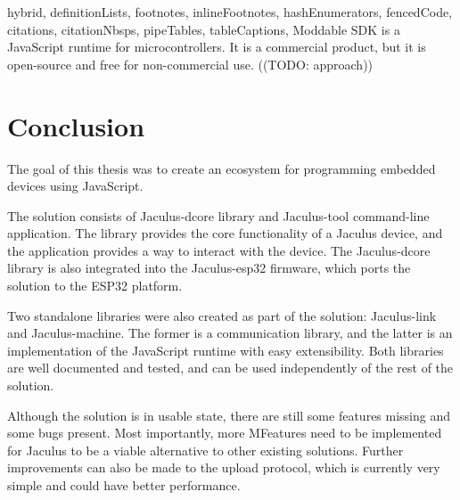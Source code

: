 \begin{markdown*}{%
  hybrid,
  definitionLists,
  footnotes,
  inlineFootnotes,
  hashEnumerators,
  fencedCode,
  citations,
  citationNbsps,
  pipeTables,
  tableCaptions,
}
Moddable SDK is a JavaScript runtime for microcontrollers. It is a commercial product, but it is open-source and free for non-commercial use. ((TODO: approach))


\chapter{Conclusion}

The goal of this thesis was to create an ecosystem for programming embedded devices using JavaScript.

The solution consists of Jaculus-dcore library and Jaculus-tool command-line application. The library provides the core functionality of a Jaculus device, and the application provides a way to interact with the device. The Jaculus-dcore library is also integrated into the Jaculus-esp32 firmware, which ports the solution to the ESP32 platform.

Two standalone libraries were also created as part of the solution: Jaculus-link and Jaculus-machine. The former is a communication library, and the latter is an implementation of the JavaScript runtime with easy extensibility. Both libraries are well documented and tested, and can be used independently of the rest of the solution.

Although the solution is in usable state, there are still some features missing and some bugs present. Most importantly, more MFeatures need to be implemented for Jaculus to be a viable alternative to other existing solutions. Further improvements can also be made to the upload protocol, which is currently very simple and could have better performance.

\end{markdown*}
